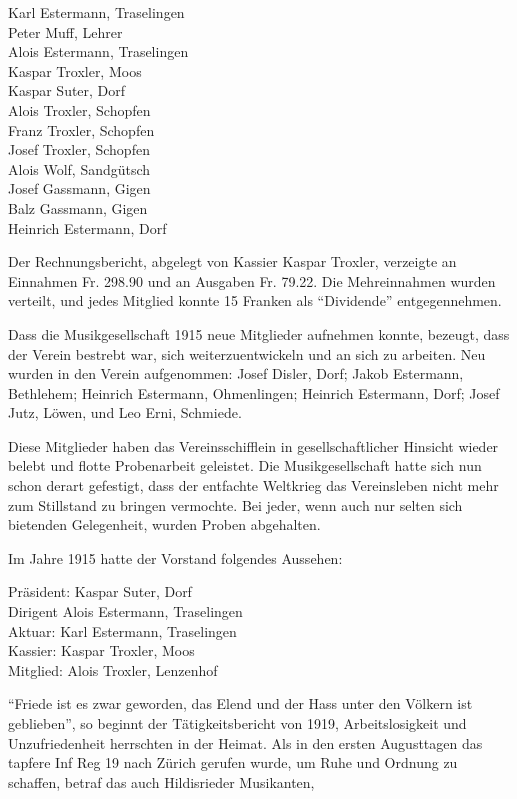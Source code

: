 \begin{multicols}{2}
    \noindent
    Karl Estermann, Traselingen\\
    Peter Muff, Lehrer\\
    Alois Estermann, Traselingen\\
    Kaspar Troxler, Moos\\
    Kaspar Suter, Dorf\\
    Alois Troxler, Schopfen\\
    Franz Troxler, Schopfen\\
    Josef Troxler, Schopfen\\
    Alois Wolf, Sandgütsch\\
    Josef Gassmann, Gigen\\
    Balz Gassmann, Gigen\\
    Heinrich Estermann, Dorf

    Der Rechnungsbericht, abgelegt von Kassier Kaspar Troxler, verzeigte an
    Einnahmen Fr. 298.90 und an Ausgaben Fr. 79.22. Die Mehreinnahmen wurden
    verteilt, und jedes Mitglied konnte 15 Franken als "`Dividende"'
    entgegennehmen.

    Dass die Musikgesellschaft 1915 neue Mitglieder aufnehmen konnte, bezeugt,
    dass der Verein bestrebt war, sich weiterzuentwickeln und an sich zu
    arbeiten. Neu wurden in den Verein aufgenommen: Josef Disler, Dorf; Jakob
    Estermann, Bethlehem; Heinrich Estermann, Ohmenlingen; Heinrich
    Estermann, Dorf; Josef Jutz, Löwen, und Leo Erni, Schmiede.

    Diese Mitglieder haben das Vereinsschifflein in gesellschaftlicher Hinsicht
    wieder belebt und flotte Probenarbeit geleistet. Die Musikgesellschaft hatte
    sich nun schon derart gefestigt, dass der entfachte Weltkrieg das
    Vereinsleben nicht mehr zum Stillstand zu bringen vermochte. Bei jeder, wenn
    auch nur selten sich bietenden Gelegenheit, wurden Proben abgehalten.

    Im Jahre 1915 hatte der Vorstand folgendes Aussehen:

    \noindent
    Präsident: Kaspar Suter, Dorf\\
    Dirigent Alois Estermann, Traselingen\\
    Aktuar: Karl Estermann, Traselingen\\
    Kassier: Kaspar Troxler, Moos\\
    Mitglied: Alois Troxler, Lenzenhof

    "`Friede ist es zwar geworden, das Elend und der Hass unter den Völkern ist
    geblieben"', so beginnt der Tätigkeitsbericht von 1919, Arbeitslosigkeit und
    Unzufriedenheit herrschten in der Heimat. Als in den ersten Augusttagen das
    tapfere Inf Reg 19 nach Zürich gerufen wurde, um Ruhe und Ordnung zu
    schaffen, betraf das auch Hildisrieder Musikanten,


\end{multicols}
